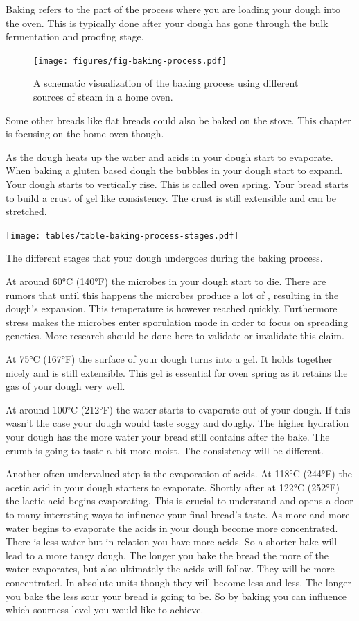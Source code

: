 Baking refers to the part of the process where you are loading
your dough into the oven. This is typically done after your
dough has gone through the bulk fermentation and proofing stage.

\begin{figure}[!htb]
  \texttt{[image: figures/fig-baking-process.pdf]}
  \caption{A schematic visualization of the baking process using different sources of steam in a home oven.}
  \label{fig:baking-process}
\end{figure}

Some other breads like flat breads
could also be baked on the stove. This chapter is focusing on the
home oven though.

As the dough heats up the water and acids
in your dough start to evaporate. When baking
a gluten based dough the bubbles in your dough start to expand.
Your dough starts to vertically rise. This is called oven spring.
Your bread starts to build a crust of gel like consistency. The crust is still
extensible and can be stretched.

\begin{table}[htp!]
  \texttt{[image: tables/table-baking-process-stages.pdf]}
  \caption{The different stages that your dough undergoes during the baking process.}
\end{table}

At around 60°C (140°F) the microbes in your dough start to die.
There are rumors that until this happens the microbes produce
a lot of , resulting in the dough's expansion. This temperature
is however reached quickly. Furthermore stress makes the microbes
enter sporulation mode in order to focus on spreading genetics.
More research should be done here to validate or invalidate this
claim.

At 75°C (167°F) the surface of your dough turns into a gel. It
holds together nicely and is still extensible. This gel is essential
for oven spring as it retains the gas of your dough very well.

At around 100°C (212°F) the water starts to evaporate out of your
dough. If this wasn't the case your dough would taste soggy and
doughy. The higher hydration your dough has the more water your bread
still contains after the bake. The crumb is going to taste a bit
more moist. The consistency will be different.

Another often undervalued step is the evaporation of acids. At
118°C (244°F) the acetic acid in your dough starters to evaporate.
Shortly after at 122°C (252°F) the lactic acid begins evaporating.
This is crucial to understand and opens a door to many interesting
ways to influence your final bread's taste. As more and more water
begins to evaporate the acids in your dough become more concentrated.
There is less water but in relation you have more acids. So a shorter
bake will lead to a more tangy dough. The longer you bake the bread
the more of the water evaporates, but also ultimately the acids will follow.
They will be more concentrated. In absolute units though they
will become less and less. The longer you bake the less sour
your bread is going to be. So by baking you can
influence which sourness level you would like to achieve.

